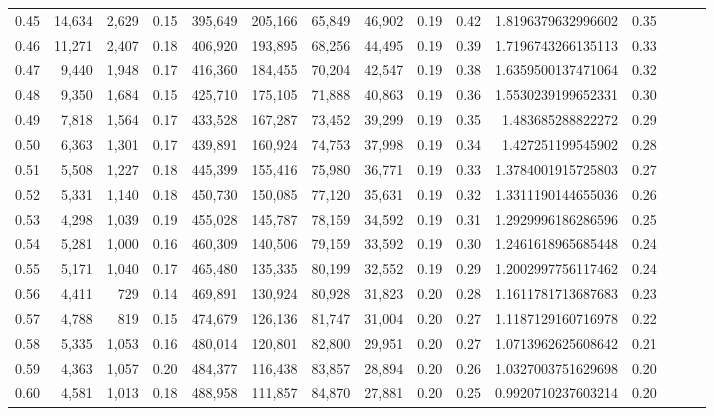 \begin{tabular}{rrrrrrrrrrrrrrr}
0.45 &  14,634 &  2,629 &  0.15 &  395,649 &  205,166 &   65,849 &   46,902 &  0.19 &  0.42 &   1.8196379632996602 &      0.35 \\
0.46 &  11,271 &  2,407 &  0.18 &  406,920 &  193,895 &   68,256 &   44,495 &  0.19 &  0.39 &   1.7196743266135113 &      0.33 \\
0.47 &   9,440 &  1,948 &  0.17 &  416,360 &  184,455 &   70,204 &   42,547 &  0.19 &  0.38 &   1.6359500137471064 &      0.32 \\
0.48 &   9,350 &  1,684 &  0.15 &  425,710 &  175,105 &   71,888 &   40,863 &  0.19 &  0.36 &   1.5530239199652331 &      0.30 \\
0.49 &   7,818 &  1,564 &  0.17 &  433,528 &  167,287 &   73,452 &   39,299 &  0.19 &  0.35 &    1.483685288822272 &      0.29 \\
0.50 &   6,363 &  1,301 &  0.17 &  439,891 &  160,924 &   74,753 &   37,998 &  0.19 &  0.34 &    1.427251199545902 &      0.28 \\
0.51 &   5,508 &  1,227 &  0.18 &  445,399 &  155,416 &   75,980 &   36,771 &  0.19 &  0.33 &   1.3784001915725803 &      0.27 \\
0.52 &   5,331 &  1,140 &  0.18 &  450,730 &  150,085 &   77,120 &   35,631 &  0.19 &  0.32 &   1.3311190144655036 &      0.26 \\
0.53 &   4,298 &  1,039 &  0.19 &  455,028 &  145,787 &   78,159 &   34,592 &  0.19 &  0.31 &   1.2929996186286596 &      0.25 \\
0.54 &   5,281 &  1,000 &  0.16 &  460,309 &  140,506 &   79,159 &   33,592 &  0.19 &  0.30 &   1.2461618965685448 &      0.24 \\
0.55 &   5,171 &  1,040 &  0.17 &  465,480 &  135,335 &   80,199 &   32,552 &  0.19 &  0.29 &   1.2002997756117462 &      0.24 \\
0.56 &   4,411 &    729 &  0.14 &  469,891 &  130,924 &   80,928 &   31,823 &  0.20 &  0.28 &   1.1611781713687683 &      0.23 \\
0.57 &   4,788 &    819 &  0.15 &  474,679 &  126,136 &   81,747 &   31,004 &  0.20 &  0.27 &   1.1187129160716978 &      0.22 \\
0.58 &   5,335 &  1,053 &  0.16 &  480,014 &  120,801 &   82,800 &   29,951 &  0.20 &  0.27 &   1.0713962625608642 &      0.21 \\
0.59 &   4,363 &  1,057 &  0.20 &  484,377 &  116,438 &   83,857 &   28,894 &  0.20 &  0.26 &   1.0327003751629698 &      0.20 \\
0.60 &   4,581 &  1,013 &  0.18 &  488,958 &  111,857 &   84,870 &   27,881 &  0.20 &  0.25 &   0.9920710237603214 &      0.20 \\

\end{tabular}
